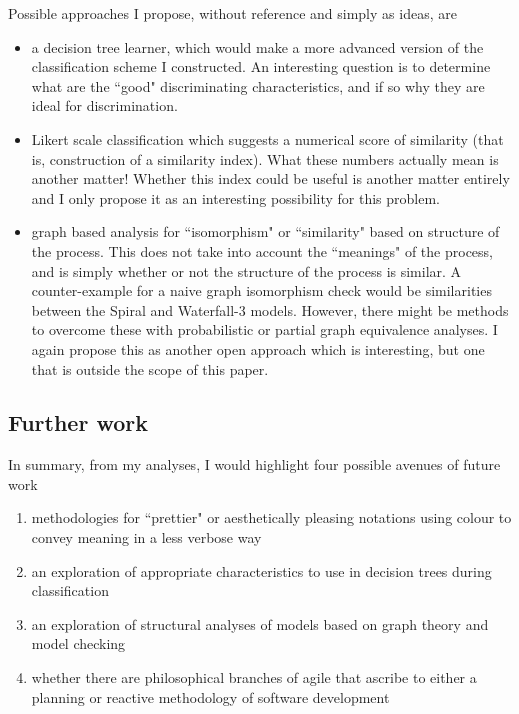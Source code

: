 Possible approaches I propose, without reference and simply as ideas, are
\begin{itemize}
  \item a decision tree learner, which would make a more advanced version of
  the classification scheme I constructed. An interesting question is to
  determine what are the ``good" discriminating characteristics, and if so why
  they are ideal for discrimination.
  \item Likert scale classification which suggests a numerical score of
  similarity (that is, construction of a similarity index).
  What these numbers actually mean is another matter!
  Whether this index could be useful is another matter entirely and I only
  propose it as an interesting possibility for this problem.
  \item graph based analysis for ``isomorphism" or ``similarity" based on
  structure of the process. This does not take into account the ``meanings"
  of the process, and is simply whether or not the structure of the process is
  similar.
  A counter-example for a naive graph isomorphism check would be similarities
  between the Spiral and Waterfall-3 models.
  However, there might be methods to overcome these with probabilistic or
  partial graph equivalence analyses.
  I again propose this as another open approach which is interesting, but one
  that is outside the scope of this paper.
\end{itemize}

\subsection{Further work}

In summary, from my analyses, I would highlight four possible avenues of future
work
\begin{enumerate}
  \item methodologies for ``prettier" or aesthetically pleasing notations using
  colour to convey meaning in a less verbose way
  \item an exploration of appropriate characteristics to use in decision trees
  during classification
  \item an exploration of structural analyses of models based on graph theory
  and model checking
  \item whether there are philosophical branches of agile that ascribe to
  either a planning or reactive methodology of software development
\end{enumerate}
